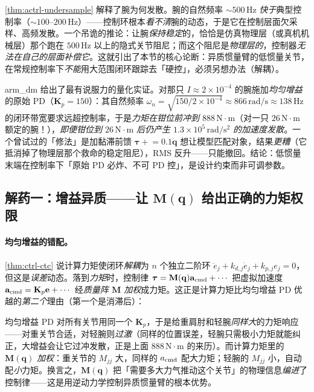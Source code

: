 \begin{insight}
\cref{thm:actrl-undersample} 解释了腕为何发散。腕的自然频率 $\sim500\,\mathrm{Hz}$ \emph{快于}典型控制率（$\sim100$--$200\,\mathrm{Hz}$）——控制环根本\emph{看不清}腕的动态，于是它在控制层面欠采样、高频发散。一个吊诡的推论：让腕\emph{保持稳定}的，恰恰是仿真物理层（或真机机械层）那个跑在 $500\,\mathrm{Hz}$ 以上的隐式关节阻尼；而这个阻尼是\emph{物理层的}，控制器\emph{无法在自己的层面补偿它}。这就引出了本节的核心论断：异质惯量臂的低惯量关节，在常规控制率下\emph{不能}用大范围闭环跟踪去「硬控」，必须另想办法（解耦）。
\end{insight}

\begin{note}
arm\_dm 给出了最有说服力的量化实证。对那只 $I\approx2\times10^{-4}$ 的腕施加\emph{均匀增益}的原始 PD（$\mathbf{K}_p=150$）：其自然频率 $\omega_n=\sqrt{150/2\times10^{-4}}\approx866\,\mathrm{rad/s}\approx138\,\mathrm{Hz}$ 的闭环带宽要求远超控制率，于是\emph{力矩在钳位前冲到 $888\,\mathrm{N\!\cdot\!m}$}（对一只 $26\,\mathrm{N\!\cdot\!m}$ 额定的腕！），\emph{即便钳位到 $26\,\mathrm{N\!\cdot\!m}$ 后仍产生 $1.3\times10^5\,\mathrm{rad/s^2}$ 的加速度发散}。一个曾试过的「修法」是加黏滞前馈 $\boldsymbol{\tau}\mathrel{+}=0.1\dot{\mathbf{q}}$ 想让模型匹配对象，结果\emph{更糟}（它抵消掉了物理层那个救命的稳定阻尼），RMS 反升——只能撤回。结论：低惯量末端在控制率下「原始 PD 必炸、不可 PD 控」，是设计约束而非可调参数。
\end{note}

\subsection{解药一：增益异质——让 \texorpdfstring{$\mathbf{M}(\mathbf{q})$}{M(q)} 给出正确的力矩权限}
\label{sec:actrl-gainhetero}

\paragraph{均匀增益的错配。}
\cref{thm:ctrl-ctc} 说计算力矩使闭环\emph{解耦}为 $n$ 个独立二阶环 $\ddot{e}_j+k_{d,j}\dot{e}_j+k_{p,j}e_j=0$，但这是\emph{误差}动态。落到\emph{力矩}时，控制律 $\boldsymbol{\tau}=\mathbf{M}(\mathbf{q})\mathbf{a}_{\rm cmd}+\cdots$ 把虚拟加速度 $\mathbf{a}_{\rm cmd}=\mathbf{K}_p\mathbf{e}+\cdots$ 经\emph{质量阵 $\mathbf{M}$ 加权}成力矩。这正是计算力矩比均匀增益 PD 优越的\emph{第二个}理由（第一个是消滞后）：

\begin{insight}
均匀增益 PD 对所有关节用同一个 $\mathbf{K}_p$，于是给重肩肘和轻腕\emph{同样大}的力矩响应——对重关节合适，对轻腕则\emph{过激}（同样的位置误差，轻腕只需极小力矩就能纠正，大增益会让它过冲发散，正是上面 $888\,\mathrm{N\!\cdot\!m}$ 的来历）。而计算力矩里的 $\mathbf{M}(\mathbf{q})$ \emph{加权}：重关节的 $M_{jj}$ 大，同样的 $a_{\rm cmd}$ 配大力矩；轻腕的 $M_{jj}$ 小，自动配\emph{小}力矩。换言之，$\mathbf{M}(\mathbf{q})$ 把「需要多大力气推动这个关节」的物理信息\emph{编进}了控制律——这是用逆动力学控制异质惯量臂的根本优势。
\end{insight}

